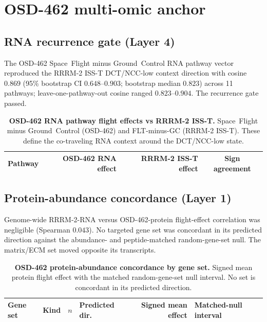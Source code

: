 \documentclass[10pt]{article}
\begin{document}
\section{OSD-462 multi-omic anchor}

\subsection{RNA recurrence gate (Layer 4)}

The OSD-462 Space~Flight minus Ground~Control RNA pathway vector reproduced the RRRM-2 ISS-T DCT/NCC-low context direction with cosine $0.869$ (95\% bootstrap CI $0.648$--$0.903$; bootstrap median $0.823$) across 11 pathways; leave-one-pathway-out cosine ranged $0.823$--$0.904$. The recurrence gate passed.

\begin{table}[H]
\centering\small
\caption{\textbf{OSD-462 RNA pathway flight effects vs RRRM-2 ISS-T.} Space~Flight minus Ground~Control (OSD-462) and FLT-minus-GC (RRRM-2 ISS-T). These define the co-traveling RNA context around the DCT/NCC-low state.}
\label{tab:rnapath}
\begin{tabular}{lrrc}
\toprule
Pathway & OSD-462 RNA effect & RRRM-2 ISS-T effect & Sign agreement \\
\midrule
%
\end{tabular}
\end{table}

\subsection{Protein-abundance concordance (Layer 1)}

Genome-wide RRRM-2-RNA versus OSD-462-protein flight-effect correlation was negligible (Spearman $0.043$). No targeted gene set was concordant in its predicted direction against the abundance- and peptide-matched random-gene-set null. The matrix/ECM set moved opposite its transcripts.

\begin{table}[H]
\centering\small
\caption{\textbf{OSD-462 protein-abundance concordance by gene set.} Signed mean protein flight effect with the matched random-gene-set null interval. No set is concordant in its predicted direction.}
\label{tab:protconc}
\begin{tabular}{llrlrl}
\toprule
Gene set & Kind & $n$ & Predicted dir. & Signed mean effect & Matched-null interval \\
\midrule
%
\end{tabular}
\end{table}
\end{document}
